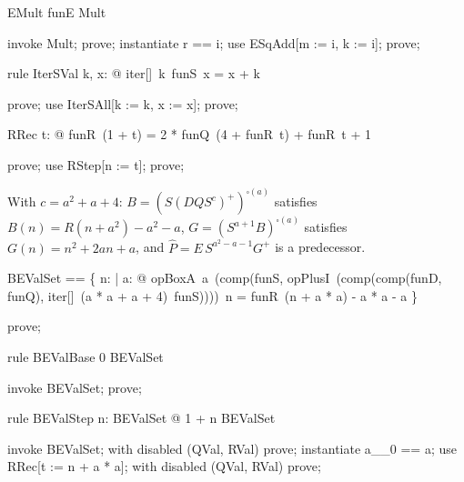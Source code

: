 \documentclass{article}
\begin{document}
\begin{theorem}{EMult}
  funE \in Mult
\end{theorem}

\begin{zproof}
invoke Mult;
prove;
instantiate r == i;
use ESqAdd[m := i, k := i];
prove;
\end{zproof}

\begin{theorem}{rule IterSVal}
  \forall k, x: \nat @ iter[\nat]~k~funS~x = x + k
\end{theorem}

\begin{zproof}
prove;
use IterSAll[k := k, x := x];
prove;
\end{zproof}

\begin{theorem}{RRec}
  \forall t: \nat @ funR~(1 + t) = 2 * funQ~(4 + funR~t) + funR~t + 1
\end{theorem}

\begin{zproof}
prove;
use RStep[n := t];
prove;
\end{zproof}

With $c = a^2 + a + 4$: $B = (S (D Q S^c)^+)^{\square(a)}$ satisfies $B(n) = R(n + a^2) - a^2 - a$,
$G = (S^{a+1} B)^{\square(a)}$ satisfies $G(n) = n^2 + 2an + a$, and
$\hat P = E\,S^{a^2 - a - 1} G^+$ is a predecessor.

\begin{zed}
  BEValSet == \{ n: \nat | \forall a: \nat @ opBoxA~a~(comp(funS, opPlusI~(comp(comp(funD, funQ), iter[\nat]~(a * a + a + 4)~funS))))~n = funR~(n + a * a) - a * a - a \}
\end{zed}

\begin{zproof}
prove;
\end{zproof}

\begin{theorem}{rule BEValBase}
  0 \in BEValSet
\end{theorem}

\begin{zproof}
invoke BEValSet;
prove;
\end{zproof}

\begin{theorem}{rule BEValStep}
  \forall n: BEValSet @ 1 + n \in BEValSet
\end{theorem}

\begin{zproof}
invoke BEValSet;
with disabled (QVal, RVal) prove;
instantiate a\_\_0 == a;
use RRec[t := n + a * a];
with disabled (QVal, RVal) prove;
\end{zproof}
\end{document}
